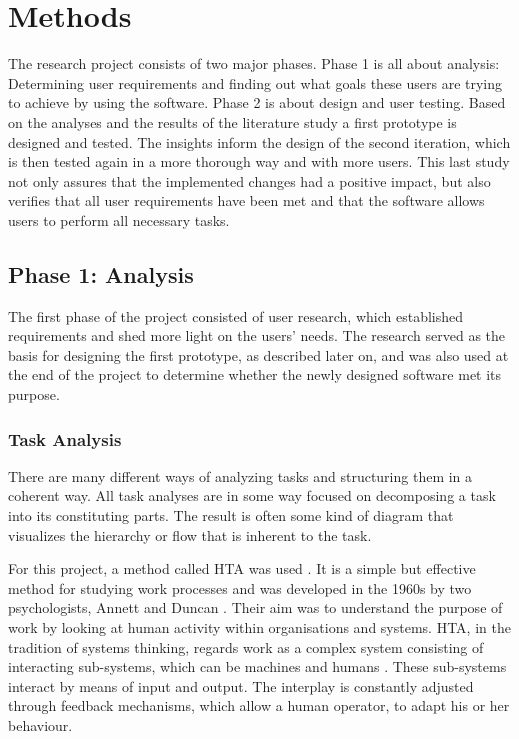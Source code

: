 \chapter{Methods} \label{chapter:methods}
The research project consists of two major phases. Phase 1 is all about analysis: Determining user requirements and finding out what goals these users are trying to achieve by using the software. Phase 2 is about design and user testing. Based on the analyses and the results of the literature study a first prototype is designed and tested. The insights inform the design of the second iteration, which is then tested again in a more thorough way and with more users. This last study not only assures that the implemented changes had a positive impact, but also verifies that all user requirements have been met and that the software allows users to perform all necessary tasks.

\section{Phase 1: Analysis}
The first phase of the project consisted of user research, which established requirements and shed more light on the users' needs. The research served as the basis for designing the first prototype, as described later on, and was also used at the end of the project to determine whether the newly designed software met its purpose.

\subsection{Task Analysis}
There are many different ways of analyzing tasks and structuring them in a coherent way. All task analyses are in some way focused on decomposing a task into its constituting parts. The result is often some kind of diagram that visualizes the hierarchy or flow that is inherent to the task.

For this project, a method called \ac{HTA} was used \cite{hornsby_hierarchical_2010}. It is a simple but effective method for studying work processes and was developed in the 1960s by two psychologists, Annett and Duncan \cite{shepherd_hierarchial_2000}. Their aim was to understand the purpose of work by looking at human activity within organisations and systems. HTA, in the tradition of systems thinking, regards work as a complex system consisting of  interacting sub-systems, which can be machines and humans \cite{shepherd_hierarchial_2000}. These sub-systems interact by means of input and output. The interplay is constantly adjusted through feedback mechanisms, which allow a human operator, to adapt his or her behaviour.

